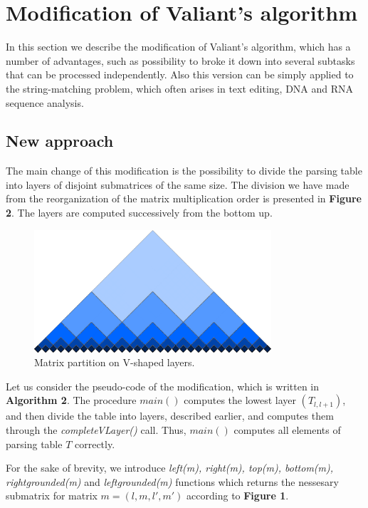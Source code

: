 \section{Modification of Valiant's algorithm}

In this section we describe the modification of Valiant's algorithm, which has a number of advantages, such as possibility to broke it down into several subtasks that can be processed independently. Also this version can be simply applied to the string-matching problem, which often arises in text editing, DNA and RNA sequence analysis.

\subsection{New approach}

The main change of this modification is the possibility to divide the parsing table into layers of disjoint submatrices of the same size. The division we have made from the reorganization of the matrix multiplication order is presented in \textbf{Figure 2}.  The layers are computed successively from the bottom up.

\begin{figure}[h]
\includegraphics[width=250pt]{layers2.eps}
\centering
\caption{Matrix partition on V-shaped layers.} \label{fig1}
\end{figure}

Let us consider the pseudo-code of the modification, which is written in \textbf{Algorithm 2}. The procedure $main()$ computes the lowest layer $(T_{l, l+1})$, and then divide the table into layers, described earlier, and computes them through the \textit{completeVLayer()} call. Thus, $main()$ computes all elements of parsing table $T$ correctly.

For the sake of brevity, we introduce \textit{left(m), right(m), top(m), bottom(m), rightgrounded(m)} and \textit{leftgrounded(m)} functions which returns the nessesary submatrix for matrix $m = (l, m, l', m')$ according to \textbf{Figure 1}.

